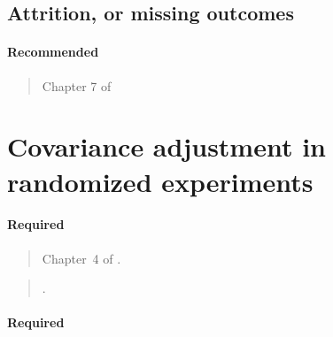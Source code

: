 \documentclass[12pt]{article}
\begin{document}
\begin{verse}  \end{verse}

\begin{verse}  \end{verse}

\begin{verse}  \end{verse}

\subsection{Attrition, or missing outcomes}

\paragraph*{Recommended}

\begin{verse} Chapter 7 of  \end{verse}

\begin{verse}  \end{verse}

\begin{verse}  \end{verse}

\section{Covariance adjustment in randomized experiments}

\paragraph*{Required}

\begin{verse}
  Chapter~4 of .
\end{verse}

\begin{verse}
  .
\end{verse}

\begin{verse}  \end{verse}

\paragraph*{Required}
\end{document}

